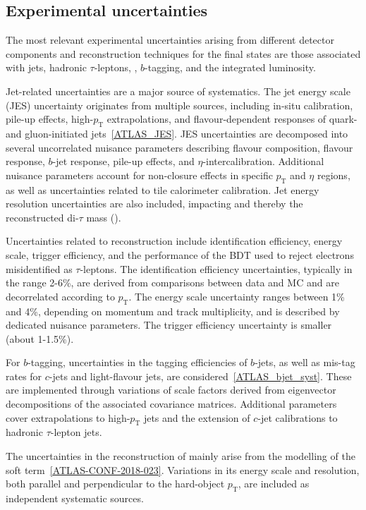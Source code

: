 \subsection{Experimental uncertainties}
\label{subsec:exp_syst}

The most relevant experimental uncertainties arising from different detector components and reconstruction techniques for the \ttHtt final states are those associated with jets, hadronic $\tau$-leptons, \etmiss, $b$-tagging, and the integrated luminosity.  

Jet-related uncertainties are a major source of systematics. The jet energy scale (JES) uncertainty originates from multiple sources, including in-situ calibration, pile-up effects, high-$p_{\text{T}}$ extrapolations, and flavour-dependent responses of quark- and gluon-initiated jets~\ref{ATLAS_JES}. JES uncertainties are decomposed into several uncorrelated nuisance parameters describing flavour composition, flavour response, $b$-jet response, pile-up effects, and $\eta$-intercalibration. Additional nuisance parameters account for non-closure effects in specific $p_{\text{T}}$ and $\eta$ regions, as well as uncertainties related to tile calorimeter calibration. Jet energy resolution uncertainties are also included, impacting \etmiss and thereby the reconstructed di-$\tau$ mass (\mmc).  

Uncertainties related to \tauhad reconstruction include identification efficiency, energy scale, trigger efficiency, and the performance of the BDT used to reject electrons misidentified as $\tau$-leptons. The identification efficiency uncertainties, typically in the range 2-6\%, are derived from comparisons between data and MC and are decorrelated according to $p_{\text{T}}$. The energy scale uncertainty ranges between 1\% and 4\%, depending on momentum and track multiplicity, and is described by dedicated nuisance parameters. The trigger efficiency uncertainty is smaller (about 1-1.5\%).  

For $b$-tagging, uncertainties in the tagging efficiencies of $b$-jets, as well as mis-tag rates for $c$-jets and light-flavour jets, are considered~\ref{ATLAS_bjet_syst}. These are implemented through variations of scale factors derived from eigenvector decompositions of the associated covariance matrices. Additional parameters cover extrapolations to high-$p_{\text{T}}$ jets and the extension of $c$-jet calibrations to hadronic $\tau$-lepton jets.  

The uncertainties in the reconstruction of \etmiss mainly arise from the modelling of the soft term~\ref{ATLAS-CONF-2018-023}. Variations in its energy scale and resolution, both parallel and perpendicular to the hard-object $p_{\text{T}}$, are included as independent systematic sources.  

